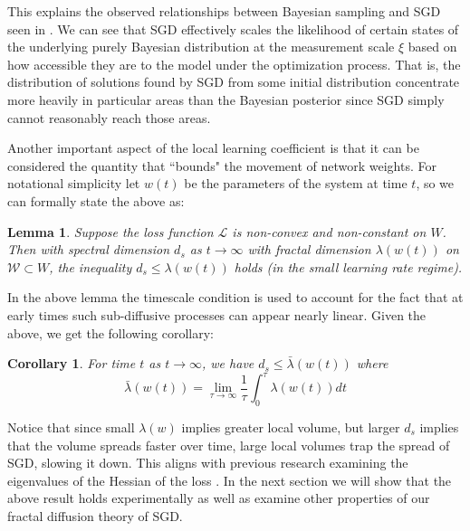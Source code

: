 \documentclass{article} %
\newtheorem{lemma}{Lemma}[section]
\newtheorem{corollary}{Corollary}[section]
\theoremstyle{definition}
\begin{document}

This explains the observed relationships between Bayesian sampling and SGD seen in \citep{mingard2020sgdbayesiansamplerwell}. We can see that SGD effectively scales the likelihood of certain states of the underlying purely Bayesian distribution at the measurement scale $\xi$ based on how accessible they are to the model under the optimization process. That is, the distribution of solutions found by SGD from some initial distribution concentrate more heavily in particular areas than the Bayesian posterior since SGD simply cannot reasonably reach those areas.

Another important aspect of the local learning coefficient is that it can be considered the quantity that ``bounds" the movement of network weights. For notational simplicity let $w(t)$ be the parameters of the system at time $t$, so we can formally state the above as:
\begin{lemma}\label{lem:spect_ineq}
Suppose the loss function $\mathcal{L}$ is non-convex and non-constant on $W$. Then with spectral dimension $d_s$ as $t \to \infty$ with fractal dimension $\lambda(w(t))$ on $\mathcal{W} \subset W$, the inequality $d_s \leq \lambda(w(t))$ holds (in the small learning rate regime).
\end{lemma}
In the above lemma the timescale condition is used to account for the fact that at early times such sub-diffusive processes can appear nearly linear. Given the above, we get the following corollary:
\begin{corollary}\label{cor:av_spect}
    For time $t$ as $t \to \infty$, we have $d_s \leq \bar{\lambda}(w(t))$ where
    \begin{equation}
        \bar{\lambda}(w(t)) = \lim_{\tau \to \infty} \frac{1}{\tau} \int_0^\tau \lambda(w(t)) dt
    \end{equation}
\end{corollary}
Notice that since small $\lambda(w)$ implies greater local volume, but larger $d_s$ implies that the volume spreads faster over time, large local volumes trap the spread of SGD, slowing it down. This aligns with previous research examining the eigenvalues of the Hessian of the loss \citep{Sagun2016Eigenvalues}. In the next section we will show that the above result holds experimentally as well as examine other properties of our fractal diffusion theory of SGD.
\end{document}
